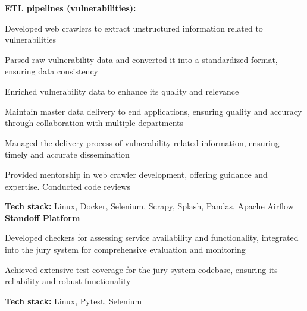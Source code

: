 \documentclass[a4paper]{MagicalCV}
\begin{document}
\begin{minipage}[t]{0.64\textwidth}
\textbf{ETL pipelines (vulnerabilities):}
\begin{tightemize}
  \item Developed web crawlers to extract unstructured information related to vulnerabilities
  \item Parsed raw vulnerability data and converted it into a standardized format, ensuring data consistency
  \item Enriched vulnerability data to enhance its quality and relevance
  \item Maintain master data delivery to end applications, ensuring quality and accuracy through collaboration with multiple departments
  \item Managed the delivery process of vulnerability-related information, ensuring timely and accurate dissemination
  \item Provided mentorship in web crawler development, offering guidance and expertise. Conducted code reviews
\end{tightemize}
\textbf{Tech stack:} Linux, Docker, Selenium, Scrapy, Splash, Pandas, Apache Airflow \\
\vspace{10pt}
\textbf{Standoff Platform}
\begin{tightemize}
  \item Developed checkers for assessing service availability and functionality, integrated into the jury system for comprehensive evaluation and monitoring
  \item Achieved extensive test coverage for the jury system codebase, ensuring its reliability and robust functionality
\end{tightemize}
\textbf{Tech stack:} Linux, Pytest, Selenium
\sectionsep


\end{minipage} 
\end{document}
